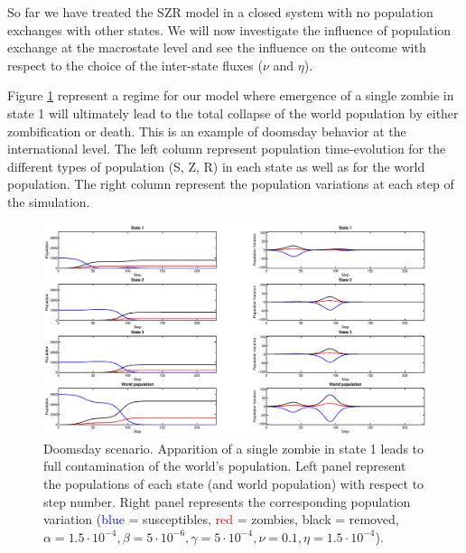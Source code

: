 \documentclass[11pt]{article} %
\begin{document}
So far we have treated the SZR model in a closed system with no population exchanges with other states. We will now investigate the influence of population exchange at the macrostate level and see the influence on the outcome with respect to the choice of the inter-state fluxes ($\nu$ and $\eta$). 

Figure \ref{doomsday} represent a regime for our model where emergence of a single zombie in state 1 will ultimately lead to the total collapse of the world population by either zombification or death. This is an example of doomsday behavior at the international level. The left column represent population time-evolution for the different types of population (S, Z, R) in each state as well as for the world population. The right column represent the population variations at each step of the simulation. 
\begin{figure}[h!]
\centerline{
\includegraphics[scale=0.35]{../images/Matlab_figures/example_doomsday.eps}}
\caption{Doomsday scenario. Apparition of a single zombie in state 1 leads to full contamination of the world's population. Left panel represent the populations of each state (and world population) with respect to step number. Right panel represents the corresponding population variation (\textcolor{blue}{blue} = susceptibles, \textcolor{red}{red} = zombies, black = removed, $\alpha=1.5\cdot10^{-4}, \beta=5\cdot10^{-6}, \gamma=5\cdot10^{-4}, \nu=0.1, \eta=1.5\cdot10^{-4}$). \label{doomsday} }
\end{figure}
\end{document}

